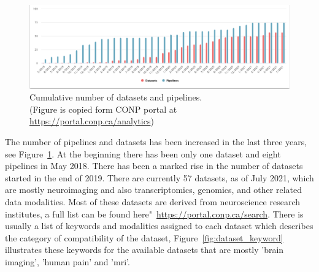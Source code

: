 \begin{figure}[ht]
  \centering
  \includegraphics[width=\textwidth,height=\textheight,keepaspectratio]{figures/PipeDataTime.png}
  \caption{Cumulative number of datasets and pipelines. \\(Figure is copied form CONP portal at \url{https://portal.conp.ca/analytics})}
  \label{fig:cumulative}
  \end{figure}

The number of pipelines and datasets has been increased in the last three years, see Figure~\ref{fig:cumulative}. At the beginning there has been only one dataset and eight pipelines in May 2018. There has been a marked rise in the number of datasets started in the end of 2019.
There are currently 57 datasets, as of July 2021, which are mostly neuroimaging and also transcriptomics, genomics, and other related data modalities. Most of these datasets are derived from neuroscience research institutes, a full list can be found here"~\url{https://portal.conp.ca/search}. There is usually a list of keywords and modalities assigned to each dataset which describes the category of compatibility of the dataset, Figure~\ref{fig:dataset_keyword} illustrates these keywords for the available datasets that are mostly 'brain imaging', 'human pain' and 'mri'. 


